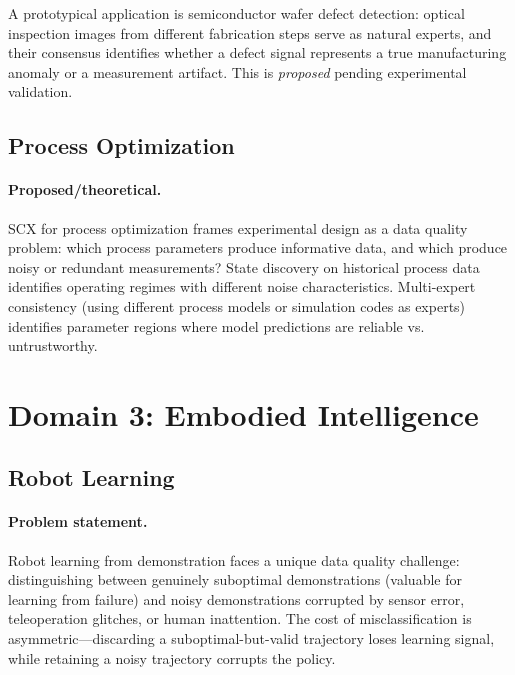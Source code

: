 \documentclass[twocolumn]{article}
\theoremstyle{definition}
\begin{document}
A prototypical application is semiconductor wafer defect detection: optical inspection images from different fabrication steps serve as natural experts, and their consensus identifies whether a defect signal represents a true manufacturing anomaly or a measurement artifact. This is \emph{proposed} pending experimental validation.

\subsection{Process Optimization}

\paragraph{Proposed/theoretical.}
SCX for process optimization frames experimental design as a data quality problem: which process parameters produce informative data, and which produce noisy or redundant measurements? State discovery on historical process data identifies operating regimes with different noise characteristics. Multi-expert consistency (using different process models or simulation codes as experts) identifies parameter regions where model predictions are reliable vs. untrustworthy.

\section{Domain 3: Embodied Intelligence}

\subsection{Robot Learning}

\paragraph{Problem statement.}
Robot learning from demonstration faces a unique data quality challenge: distinguishing between genuinely suboptimal demonstrations (valuable for learning from failure) and noisy demonstrations corrupted by sensor error, teleoperation glitches, or human inattention. The cost of misclassification is asymmetric---discarding a suboptimal-but-valid trajectory loses learning signal, while retaining a noisy trajectory corrupts the policy.
\end{document}

